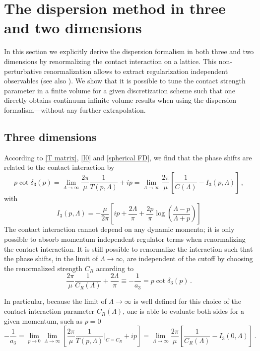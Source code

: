 \section{The dispersion method in three and two dimensions}\label{sec:3D dispersion}
In this section we explicitly derive the dispersion formalism in both three and two dimensions by renormalizing the contact interaction on a lattice.
This non-perturbative renormalization allows to extract regularization independent observables (see also ).
We show that it is possible to tune the contact strength parameter in a finite volume for a given discretization scheme such that one directly obtains continuum infinite volume results when using the dispersion formalism---without any further extrapolation.

\subsection{Three dimensions}

According to \eqref{T matrix}, \eqref{I0} and \eqref{spherical FD}, we find that the phase shifts are related to the contact interaction by
\begin{equation}\label{eq:blah blah}
	p \cot \delta_3(p)
	= \lim\limits_{\Lambda \to \infty}\frac{2 \pi}{\mu}\frac{1}{T(p, \Lambda)} + i p
	= \lim\limits_{\Lambda \to \infty}
		\frac{2 \pi}{\mu} \left[
			\frac{1}{C(\Lambda)} - I_3(p, \Lambda)
		\right]
	\, ,
\end{equation}
with
\begin{equation}
	I_3(p, \Lambda)
	=
	-\frac{\mu}{2 \pi}
	\left[
	i p + \frac{2 \Lambda}{\pi} + \frac{2  p}{\pi} \log \left( \frac{\Lambda - p}{\Lambda + p}\right)
	\right]
\end{equation}
The contact interaction cannot depend on any dynamic momenta; it is only possible to absorb momentum independent regulator terms when renormalizing the contact interaction.
It is still possible to renormalize the interaction such that the phase shifts, in the limit of $\Lambda \to \infty$, are independent of the cutoff by choosing the renormalized strength $C_R$ according to
\begin{equation}\label{eq:three-d-counterterm}
	\frac{2 \pi}{\mu} \frac{1}{C_R(\Lambda)} + \frac{2 \Lambda}{\pi}
	\equiv
	- \frac{1}{a_3}
	=
	p \cot \delta_3(p)
	\, .
\end{equation}

In particular, because the limit of $\Lambda \to \infty$ is well defined for this choice of the contact interaction parameter $C_R(\Lambda)$, one is able to evaluate both sides for a given momentum, such as $p=0$
\begin{equation}
	- \frac{1}{a_3}
	=
	\lim\limits_{p \to 0}\lim\limits_{\Lambda \to \infty}
		\left[
			\frac{2 \pi}{\mu}\frac{1}{T(p, \Lambda)} \bigg|_{C=C_R} + i p
	\right]
	=
	\lim\limits_{\Lambda \to \infty}
	\frac{2 \pi}{\mu}
		\left[
		\frac{1}{C_R(\Lambda)} - I_3(0, \Lambda)
		\right]
	\, .
\end{equation}

